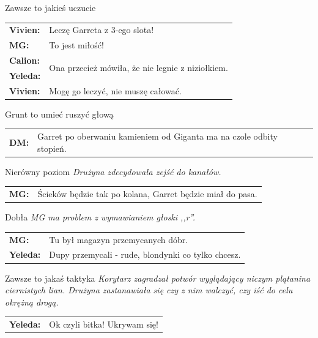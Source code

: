 \documentclass[10pt,twoside,twocolumn]{book}
\begin{document}
\begin{rpg-quotebox}{Zawsze to jakieś uczucie}
   \begin{tabularx}{\columnwidth}{lX}
      \textbf{Vivien:} & Leczę Garreta z 3-ego slota!\\
      \textbf{MG:} & To jest miłość!\\
      \textbf{Calion:} & \multirow{2}{*}{Ona przecież mówiła, że nie legnie z niziołkiem.}\\
      \textbf{Yeleda:} & \\
      \textbf{Vivien:} & Mogę go leczyć, nie muszę całować.\\
   \end{tabularx}
\end{rpg-quotebox}

\begin{rpg-quotebox}{Grunt to umieć ruszyć głową}
   \begin{tabularx}{\columnwidth}{lX}
      \textbf{DM:} & Garret po oberwaniu kamieniem od Giganta ma na czole odbity stopień.\\
   \end{tabularx}
\end{rpg-quotebox}

\begin{rpg-quotebox}{Nierówny poziom}
   \textit{Drużyna zdecydowała zejść do kanałów.}\\
   
   \begin{tabularx}{\columnwidth}{lX}
      \textbf{MG:} & Ścieków będzie tak po kolana, Garret będzie miał do pasa.\\
   \end{tabularx}
\end{rpg-quotebox}

\begin{rpg-quotebox}{Dobła}
   \textit{MG ma problem z wymawianiem głoski ,,r''.}\\
   
   \begin{tabularx}{\columnwidth}{lX}
      \textbf{MG:} & Tu był magazyn przemycanych dóbr.\\
      \textbf{Yeleda:} & Dupy przemycali - rude, blondynki co tylko chcesz.\\
   \end{tabularx}
\end{rpg-quotebox}

\begin{rpg-quotebox}{Zawsze to jakaś taktyka}
   \textit{Korytarz zagradzał potwór wyglądający niczym plątanina ciernistych lian. Drużyna zastanawiała się czy z nim walczyć, czy iść do celu okrężną drogą.}\\

   \begin{tabularx}{\columnwidth}{lX}
      \textbf{Yeleda:} & Ok czyli bitka! Ukrywam się!\\
   \end{tabularx}
\end{rpg-quotebox}
\end{document}
